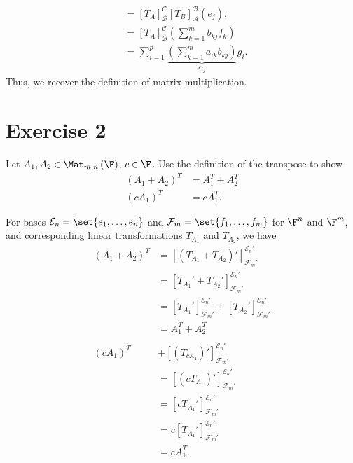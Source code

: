 \documentclass[10pt]{mypackage}
\begin{document}
\begin{solution}
\begin{enumerate}[(1)]
\begin{align*}
                                                                               &= \left[T_A\right]_{\mathcal{B}}^{\mathcal{C}}\left[T_B\right]_{\mathcal{A}}^{\mathcal{B}}\left(e_j\right),\\
                                                                               &= \left[T_A\right]_{\mathcal{B}}^{\mathcal{C}}\left(\sum_{k=1}^{m}b_{kj}f_k\right)\\
                                                                               &= \sum_{i=1}^{p}\underbrace{\left(\sum_{k=1}^{m}a_{ik}b_{kj}\right)}_{c_{ij}}g_i.
      \end{align*}
      Thus, we recover the definition of matrix multiplication.
  \end{enumerate}
\end{solution}
\section{Exercise 2}%
\begin{problem}
  Let $A_1,A_2\in \Mat_{m,n}\left(\F\right)$, $c\in \F$. Use the definition of the transpose to show
  \begin{align*}
    \left(A_1 + A_2\right)^{T} &= A_1^T + A_2^T\\
    \left(cA_1\right)^T &= cA_1^T.
  \end{align*}
\end{problem}
\begin{solution}
  For bases $\mathcal{E}_n = \set{e_1,\dots,e_n}$ and $\mathcal{F}_m = \set{f_1,\dots,f_m}$ for $\F^n$ and $\F^m$, and corresponding linear transformations $T_{A_1}$ and $T_{A_2}$, we have
  \begin{align*}
    \left(A_1 + A_2\right)^{T} &= \left[\left(T_{A_1} + T_{A_2}\right)'\right]_{\mathcal{F}_{m}'}^{\mathcal{E}_{n}'}\\
                               &= \left[T_{A_1}' + T_{A_2}'\right]_{\mathcal{F}_m'}^{\mathcal{E}_n'}\\
                               &= \left[T_{A_1}'\right]_{\mathcal{F}_m'}^{\mathcal{E}_n'} + \left[T_{A_2}'\right]_{\mathcal{F}_m'}^{\mathcal{E}_n'}\\
                               &= A_{1}^{T} + A_2^T\\
                               \\
    \left(cA_1\right)^{T} &+ \left[\left(T_{cA_1}\right)'\right]_{\mathcal{F}_m'}^{\mathcal{E}_n'}\\
                          &= \left[\left(cT_{A_1}\right)'\right]_{\mathcal{F}_m'}^{\mathcal{E}_n'}\\
                          &= \left[cT_{A_1}'\right]_{\mathcal{F}_m'}^{\mathcal{E}_n'}\\
                          &= c\left[T_{A_1}'\right]_{\mathcal{F}_m'}^{\mathcal{E}_n'}\\
                          &= cA_{1}^{T}.
  \end{align*}
\end{solution}
\end{document}
